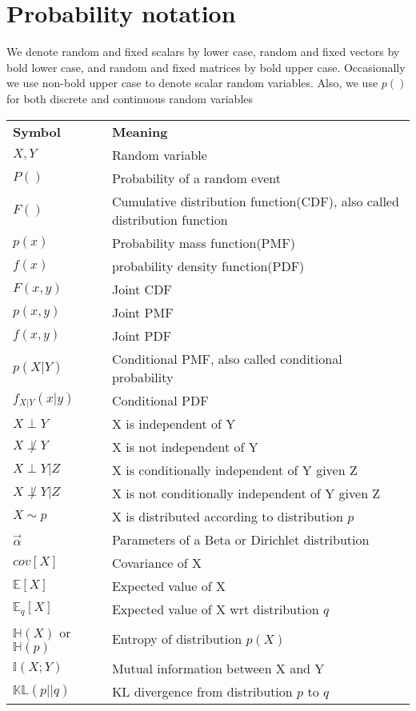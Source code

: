 \section*{Probability notation}
We denote random and fixed scalars by lower case, random and fixed vectors by bold lower case, and random and fixed matrices by bold upper case. Occasionally we use non-bold upper case to denote scalar random variables. Also, we use $p()$ for both discrete and continuous random variables

\begin{longtable}{ll}
\hline\noalign{\smallskip}
\textbf{Symbol} & \textbf{Meaning} \\
\noalign{\smallskip}\hline\noalign{\smallskip}
$X,Y$ & Random variable\\
$P()$ & Probability of a random event\\
$F()$ & Cumulative distribution function(CDF), also called distribution function\\
$p(x)$ & Probability mass function(PMF)\\
$f(x)$ & probability density function(PDF) \\
$F(x,y)$ & Joint CDF\\
$p(x,y)$ & Joint PMF \\
$f(x,y)$ & Joint PDF\\
$p(X|Y)$ & Conditional PMF, also called conditional probability\\
$f_{X|Y}(x|y)$ & Conditional PDF\\
$X \perp Y$ & X is independent of Y\\
$X \not\perp Y$ & X is not independent of Y\\
$X \perp Y | Z $ & X is conditionally independent of Y given Z\\
$X \not\perp Y | Z $ & X is not conditionally independent of Y given Z\\
$X \sim p$ & X is distributed according to distribution $p$\\
$\vec{\alpha}$ & Parameters of a Beta or Dirichlet distribution\\
$cov[X]$ & Covariance of X\\
$\mathbb{E}[X]$ & Expected value of X\\
$\mathbb{E}_q[X]$ & Expected value of X wrt distribution $q$\\
$\mathbb{H}(X)$ or $\mathbb{H}(p)$ & Entropy of distribution $p(X)$\\
$\mathbb{I}(X;Y)$ & Mutual information between X and Y\\
$\mathbb{KL}(p||q)$ & KL divergence from distribution $p$ to $q$\\

\end{longtable}
